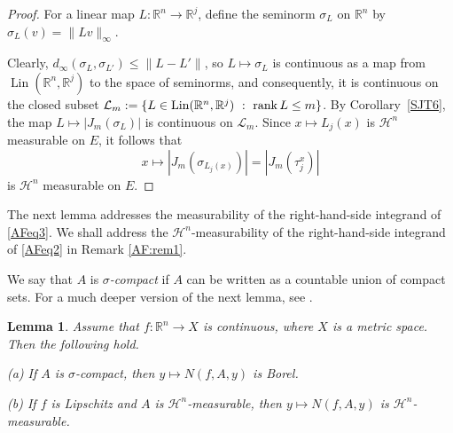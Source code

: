 \documentclass[12pt,leqno]{amsart}
\newtheorem{lemma}[theorem]{Lemma}
\theoremstyle{definition}
\newtheorem{remark}[theorem]{Remark}
\newcommand{\bbbr}{\mathbb R}
\def\H{{\mathcal H}}
\def\rank{{\rm rank\,}}
\def\md{\operatorname{md}}
\numberwithin{theorem}{section} \numberwithin{equation}{section}
\begin{document}
\begin{proof}
For a linear map $L\colon \mathbb R^n\to\mathbb R^j$, define the seminorm
$\sigma_L$ on $\mathbb R^n$ by $\sigma_L(v)=\|Lv\|_\infty$.

Clearly, $d_\infty(\sigma_L,\sigma_{L'})\leq \|L-L'\|$, so
$L\mapsto \sigma_L$ is continuous as a map from
$\operatorname{Lin}(\mathbb R^n,\mathbb R^j)$ to the space of seminorms, and consequently, it is continuous on the closed subset $\mathcal{L}_m:=\{L\in \operatorname{Lin}(\mathbb R^n,\mathbb R^j)~:~\rank L\leq m\}$. By Corollary~\ref{SJT6}, the map $L\mapsto |J_m(\sigma_L)|$ is continuous on $\mathcal{L}_m$. Since
$x\mapsto L_j(x)$ is $\H^n$ measurable on $E$, it follows that
$$
x\mapsto |J_m(\sigma_{L_j(x)})|=|J_m(\tau_j^x)|
$$
is $\H^n$ measurable on $E$.
\end{proof}









The next lemma addresses the measurability of the right-hand-side integrand of \eqref{AFeq3}. We shall address the $\H^n$-measurability of the right-hand-side integrand of \eqref{AFeq2} in Remark \ref{AF:rem1}.

We say that $A$ is {\em $\sigma$-compact} if $A$ can be written as a countable union of compact sets.
For a much deeper version of the next lemma, see \cite{evseev}.
\begin{lemma}
\label{AF:lem1}
Assume that $f\colon \mathbb R^n\to X$ is continuous, where $X$ is a metric space.
Then the following hold.

(a) If $A$ is $\sigma$-compact, then $y\mapsto N(f,A,y)$ is Borel.

(b) If $f$ is Lipschitz and $A$ is $\mathcal H^n$-measurable, then
$y\mapsto N(f,A,y)$ is $\mathcal H^n$-measurable.
\end{lemma}
\end{document}
